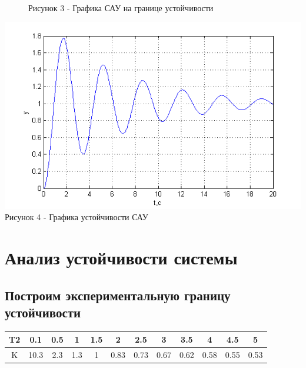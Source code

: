 \documentclass[a4paper, 11pt]{article}
\begin{document}
\begin{figure}[h]
	
	\\
	\centering Рисунок 3 - Графика САУ на границе устойчивости
\end{figure}

\begin{center}
	\includegraphics[width=0.7\linewidth]{3}
	\\
\centering Рисунок 4 - Графика устойчивости САУ
	

\end{center}

\newpage
\section{Анализ устойчивости системы}
\subsection{Построим экспериментальную границу устойчивости}
\begin{center}
\begin{tabular}{|c|c|c|c|c|c|c|c|c|c|c|c|}
	\hline 
	T2 & 0.1 & 0.5 & 1 & 1.5 & 2 & 2.5 & 3 & 3.5 & 4 & 4.5 & 5 \\ 
	\hline 
	K & 10.3 & 2.3 & 1.3 & 1 & 0.83 & 0.73 & 0.67 & 0.62 & 0.58 & 0.55 & 0.53 \\ 
	\hline 
\end{tabular} 
\end{center}
\end{document}
